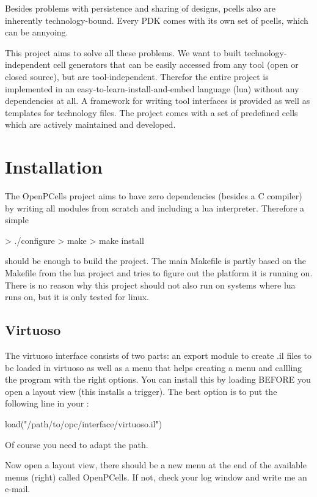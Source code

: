 Besides problems with persistence and sharing of designs, pcells also are inherently technology-bound.
Every PDK comes with its own set of pcells, which can be annyoing.

This project aims to solve all these problems.
We want to built technology-independent cell generators that can be easily accessed from any tool (open or closed source), but are tool-independent.
Therefor the entire project is implemented in an easy-to-learn-install-and-embed language (lua) without any dependencies at all.
A framework for writing tool interfaces is provided as well as templates for technology files.
The project comes with a set of predefined cells which are actively maintained and developed.

\section{Installation}
The OpenPCells project aims to have zero dependencies (besides a C compiler) by writing all modules from scratch and including a lua interpreter.
Therefore a simple
\begin{shellcode}
    > ./configure
    > make
    > make install
\end{shellcode}
should be enough to build the project.
The main Makefile is partly based on the Makefile from the lua project and tries to figure out the platform it is running on.
There is no reason why this project should not also run on systems where lua runs on, but it is only tested for linux.

\subsection{Virtuoso}
The virtuoso interface consists of two parts: an export module to create .il files to be loaded in virtuoso as well as a menu that helps creating a menu and
callling the program with the right options. You can install this by loading  BEFORE you open a layout view (this
installs a trigger). The best option is to put the following line in your :
\begin{shellcode}
    load("/path/to/opc/interface/virtuoso.il")
\end{shellcode}
Of course you need to adapt the path.

Now open a layout view, there should be a new menu at the end of the available menus (right) called OpenPCells.
If not, check your log window and write me an e-mail.


